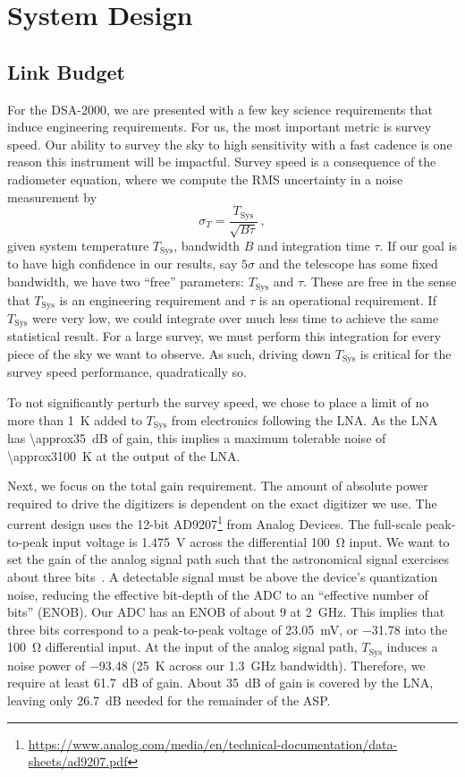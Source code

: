 \section{System Design}

\subsection{Link Budget}

For the DSA-2000, we are presented with a few key science requirements that induce engineering requirements.
For us, the most important metric is survey speed.
Our ability to survey the sky to high sensitivity with a fast cadence is one reason this instrument will be impactful.
Survey speed is a consequence of the radiometer equation, where we compute the RMS uncertainty in a noise measurement by 
\begin{equation}
    \sigma_T = \frac{T_\text{Sys}}{\sqrt{B\tau}} \,,
\end{equation}
given system temperature $T_\text{Sys}$, bandwidth $B$ and integration time $\tau$.
If our goal is to have high confidence in our results, say $5\sigma$ and the telescope has some fixed bandwidth, we have two ``free'' parameters: $T_\text{Sys}$ and $\tau$.
These are free in the sense that $T_\text{Sys}$ is an engineering requirement and $\tau$ is an operational requirement.
If $T_\text{Sys}$ were very low, we could integrate over much less time to achieve the same statistical result.
For a large survey, we must perform this integration for every piece of the sky we want to observe.
As such, driving down $T_\text{Sys}$ is critical for the survey speed performance, quadratically so.

To not significantly perturb the survey speed, we chose to place a limit of no more than \qty{1}{\K} added to $T_\text{Sys}$ from electronics following the LNA.
As the LNA has \qty{\approx35}{\dB} of gain, this implies a maximum tolerable noise of \qty[group-digits = false]{\approx3100}{\K} at the output of the LNA.

Next, we focus on the total gain requirement.
The amount of absolute power required to drive the digitizers is dependent on the exact digitizer we use.
The current design uses the 12-bit AD9207\footnote{\raggedright\url{https://www.analog.com/media/en/technical-documentation/data-sheets/ad9207.pdf}} from Analog Devices.
The full-scale peak-to-peak input voltage is \qty{1.475}{\V} across the differential \qty{100}{\ohm} input.
We want to set the gain of the analog signal path such that the astronomical signal exercises about three bits~\cite{bianchi2008adc}.
A detectable signal must be above the device's quantization noise, reducing the effective bit-depth of the ADC to an ``effective number of bits'' (ENOB).
Our ADC has an ENOB of about 9 at \qty{2}{\GHz}.
This implies that three bits correspond to a peak-to-peak voltage of \qty{23.05}{\mV}, or \qty{-31.78}{\dBm} into the \qty{100}{\ohm} differential input.
At the input of the analog signal path, $T_\text{Sys}$ induces a noise power of \qty{-93.48}{\dBm} (\qty{25}{\K} across our \qty{1.3}{\GHz} bandwidth).
Therefore, we require at least \qty{61.7}{\dB} of gain.
About \qty{35}{\dB} of gain is covered by the LNA, leaving only \qty{26.7}{\dB} needed for the remainder of the ASP.

